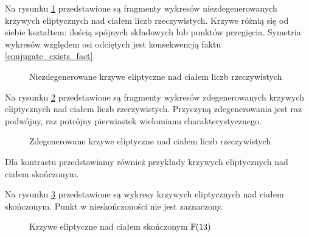 \begin{example}
Na rysunku \ref{real_nondeg_curves_fig} przedstawione są fragmenty wykresów
niezdegenerowanych krzywych eliptycznych nad ciałem liczb rzeczywistych.
Krzywe różnią się od siebie kształtem:
ilością spójnych składowych lub punktów przegięcia.
Symetria wykresów względem osi odciętych
jest konsekwencją faktu \ref{conjugate_exists_fact}.

\begin{figure}[h]
\centering
{}
\hspace{0.5cm}
\hspace{0.5cm}
\caption{Niezdegenerowane krzywe eliptyczne nad ciałem liczb rzeczywistych}
\label{real_nondeg_curves_fig}
\end{figure}
\end{example}

\begin{example}
Na rysunku \ref{real_degen_curves_fig} przedstawione są fragmenty wykresów
zdegenerowanych krzywych eliptycznych nad ciałem liczb rzeczywistych.
Przyczyną zdegenerowania jest raz podwójny, raz potrójny
pierwiastek wielomianu charakterystycznego.

\begin{figure}[h]
\centering
{}
\hspace{0.5cm}
\caption{Zdegenerowane krzywe eliptyczne nad ciałem liczb rzeczywistych}
\label{real_degen_curves_fig}
\end{figure}
\end{example}

\noindent
Dla kontrastu przedstawiamy również
przykłady krzywych eliptycznych nad ciałem skończonym.

\begin{example}
Na rysunku \ref{finite_curves_fig} przedstawione są wykresy
krzywych eliptycznych nad ciałem skończonym.
Punkt w nieskończoności nie jest zaznaczony.

\begin{figure}[h]
\centering
{}
\hspace{0.5cm}
\caption{Krzywe eliptyczne nad ciałem skończonym $\mathbb{F}(13)$}
\label{finite_curves_fig}
\end{figure}
\end{example}
